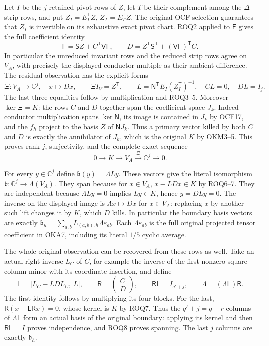 \documentclass[11pt,a4paper]{article}
\begin{document}
Let $I$ be the $j$ retained pivot rows of $Z$, let $T$ be their
complement among the $\Delta$ strip rows, and put $Z_I=E_I^{\mathsf T}Z$,
$Z_T=E_T^{\mathsf T}Z$. The original OCF selection guarantees that
$Z_I$ is invertible on its exhaustive exact pivot chart. ROQ2 applied
to $\mathsf F$ gives the full coefficient identity
\[
 \mathsf F=\mathsf SZ+C^{\mathsf T}\mathsf V\mathsf F,
 \qquad
 D=Z^{\mathsf T}\mathsf S^{\mathsf T}
                      +(\mathsf V\mathsf F)^{\mathsf T}C.
 \tag{ROQ5}
\]
In particular the unreduced invariant rows and the reduced strip rows
agree on $V_A$, with precisely the displayed conductor multiple as their
ambient difference. The residual observation has the explicit forms
\[
 \Xi:V_A\longrightarrow\mathbb C^j,\quad x\longmapsto Dx,
 \qquad \Xi I_V=Z^{\mathsf T},\qquad
 L=\mathsf N^{\mathsf T}E_I(Z_I^{\mathsf T})^{-1},
 \quad CL=0,\quad DL=I_j.
 \tag{ROQ6}
\]
The last three equalities follow by multiplication and ROQ3--5.
Moreover $\ker\Xi=K$: the rows $C$ and $D$ together span the
coefficient space $J_k$. Indeed conductor multiplication spans
$\ker\mathsf N$, its image is contained in $J_k$ by OCF17, and
the $f_h$ project to the basis $Z$ of $\mathsf NJ_k$.
Thus a primary vector killed by both $C$ and $D$ is exactly the
annihilator of $J_k$, which is the original $K$ by OKM3--5.
This proves rank $j$, surjectivity, and the complete exact sequence
\[
 0\longrightarrow K\longrightarrow V_A
       \xrightarrow{\ \Xi\ }\mathbb C^j\longrightarrow0.
 \tag{ROQ7}
\]

For every $y\in\mathbb C^j$ define
$\mathfrak b(y)=\Lambda Ly$. These vectors give the literal isomorphism
$\mathfrak b:\mathbb C^j\to\Lambda(V_A)$. They span because for
$x\in V_A$, $x-LDx\in K$ by ROQ6--7. They are independent because
$\Lambda Ly=0$ implies $Ly\in K$, hence $y=DLy=0$.
The inverse on the displayed image is $\Lambda x\mapsto Dx$ for
$x\in V_A$: replacing $x$ by another such lift changes it by $K$,
which $D$ kills. In particular the boundary basis vectors are exactly
$\mathfrak b_h=\sum_{a,b}L_{(a,b),h}\Lambda\varepsilon_{ab}$.
Each $\Lambda\varepsilon_{ab}$ is the full original projected tensor
coefficient in OKA7, including its literal $1/5$ cyclic average.

The whole original observation can be recovered from these rows as well.
Take an actual right inverse $L_C$ of $C$, for example the inverse of
the first nonzero square column minor with its coordinate insertion,
and define
\[
 \mathsf L=\bigl[L_C-LDL_C,\ L\bigr],\qquad
 \mathsf R=\begin{pmatrix}C\\D\end{pmatrix},\qquad
 \mathsf R\mathsf L=I_{q'+j},\qquad
 \Lambda=(\Lambda\mathsf L)\mathsf R.
 \tag{ROQ8}
\]
The first identity follows by multiplying its four blocks. For the
last, $\mathsf R(x-\mathsf L\mathsf Rx)=0$, whose kernel is $K$
by ROQ7. Thus the $q'+j=q-r$ columns of $\Lambda\mathsf L$ form an
actual basis of the original boundary: applying its kernel and then
$\mathsf R\mathsf L=I$ proves independence, and ROQ8 proves spanning.
The last $j$ columns are exactly $\mathfrak b_h$.
\end{document}
